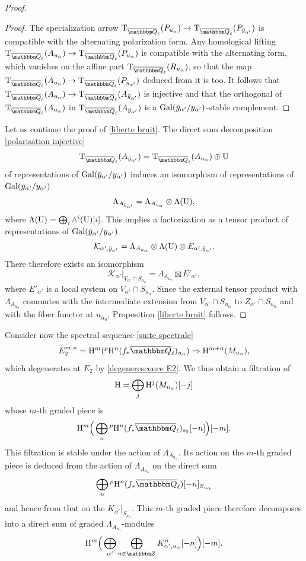 \documentclass[12pt,english]{smfart}
\numberwithin{equation}{subsection}
\theoremstyle{remark}
\newcommand\calK{{\mathcal K}}
\newcommand\rmT{{\rm T}}
\newcommand\ZZ{{\mathbbm Z}}
\newcommand\QQ{{\mathbbm Q}}
\newcommand\rmH{{\rm H}}
\newcommand\rmU{{\rm U}}
\newcommand\Gal{{\rm Gal}}
\newcommand\Ql{{\overline\QQ_\ell}}
\begin{document}
\begin{proof}
\begin{proof}
The specialization arrow $\rmT_\Ql(P_{u_\alpha})\rightarrow \rmT_\Ql(P_{\bar y_{\alpha'}})$ is compatible with the alternating polarization form. Any homological lifting $\rmT_\Ql(A_{u_\alpha})\rightarrow \rmT_\Ql(P_{u_\alpha})$ is compatible with the alternating form, which vanishes on the affine part $\rmT_\Ql(R_{u_\alpha})$, so that the map $\rmT_\Ql(A_{u_\alpha})\rightarrow \rmT_\Ql(P_{\bar y_{\alpha'}})$ deduced from it is too. It follows that $\rmT_\Ql(A_{u_\alpha})\rightarrow \rmT_\Ql(A_{\bar y_{\alpha'}})$ is injective and that the orthogonal of $\rmT_\Ql(A_{u_\alpha})$ in $\rmT_\Ql(A_{\bar y_{\alpha'}})$ is a $\Gal(\bar y_{\alpha'}/y_{\alpha'})$-stable complement.
\end{proof}

Let us continue the proof of \ref{liberte bruit}. The direct sum decomposition \ref{polarisation injective}
$$\rmT_\Ql(A_{\bar y_{\alpha'}})=\rmT_\Ql(A_{u_\alpha})\oplus \rmU$$
of representations of $\Gal(\bar y_{\alpha'}/y_{\alpha'})$ induces an isomorphism of representations of $\Gal(\bar y_{\alpha'}/y_{\alpha'})$
$$\Lambda_{A_{\bar y_{\alpha'}}}=\Lambda_{A_{u_\alpha}}\otimes \Lambda(\rmU),$$
where $\Lambda(\rmU)=\bigoplus_i \wedge^i(\rmU)[i]$. This implies a factorization as a tensor product of representations of $\Gal(\bar y_{\alpha'}/y_{\alpha'})$
$$\calK_{\alpha',\bar y_{\alpha'}}=\Lambda_{A_{u_\alpha}}\otimes \Lambda(\rmU)\otimes E_{\alpha',\bar y_{\alpha'}}.$$
There therefore exists an isomorphism
$$\calK_{\alpha'}|_{V_{\alpha'}\cap S_{u_\alpha}}=\Lambda_{A_{u_\alpha}}\boxtimes E'_{\alpha'},$$
where $E'_{\alpha'}$ is a local system on $V_{\alpha'}\cap S_{u_\alpha}$. Since the external tensor product with $\Lambda_{A_{u_\alpha}}$ commutes with the intermediate extension from $V_{\alpha'}\cap S_{u_\alpha}$ to $Z_{\alpha'}\cap S_{u_\alpha}$ and with the fiber functor at $u_{\alpha_0}$, Proposition \ref{liberte bruit} follows.
\end{proof}

Consider now the spectral sequence \ref{suite spectrale}
$$E_2^{m,n}=\rmH^m({}^p\rmH^n(f_*\Ql)_{u_\alpha})\Rightarrow \rmH^{m+n}(M_{u_\alpha}),$$
which degenerates at $E_2$ by \ref{degenerescence E2}. We thus obtain a filtration of
$$\rmH=\bigoplus_j \rmH^j(M_{u_\alpha})[-j]$$
whose $m$-th graded piece is
$$\rmH^m\Big(\bigoplus_n {}^p\rmH^n(f_*\Ql)_{s_0}[-n]\Big)[-m].$$
This filtration is stable under the action of $\Lambda_{A_{u_\alpha}}$. Its action on the $m$-th graded piece is deduced from the action of $\Lambda_{A_{u_\alpha}}$ on the direct sum
$$\bigoplus_n {}^p\rmH^n(f_*\Ql)[-n]_{S_{u_\alpha}}$$
and hence from that on the $K_{\alpha'}|_{S_{u_\alpha}}$. This $m$-th graded piece therefore decomposes into a direct sum of graded $\Lambda_{A_{u_\alpha}}$-modules
$$\rmH^m\Big(\bigoplus_{\alpha'}\bigoplus_{n\in\ZZ} K^n_{\alpha',u_\alpha}[-n]\Big)[-m].$$
\end{document}
